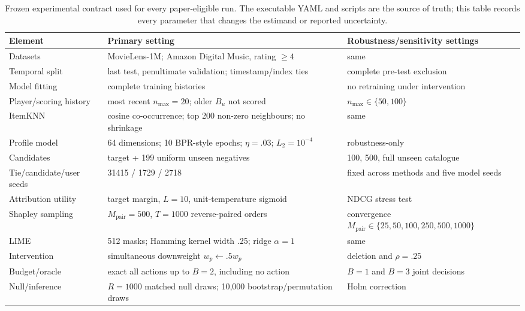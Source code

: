 \documentclass[pdflatex,sn-basic,Numbered]{sn-jnl}
\theoremstyle{thmstyleone}
\theoremstyle{thmstyletwo}
\theoremstyle{thmstylethree}
\begin{document}
\begin{appendices}
\begin{table}[t]
\centering\scriptsize
\caption{Frozen experimental contract used for every paper-eligible run. The executable YAML and scripts are the source of truth; this table records every parameter that changes the estimand or reported uncertainty.}
\label{tab:contract}
\begin{tabular}{@{}p{}p{}p{}@{}}
\toprule
Element & Primary setting & Robustness/sensitivity settings\\
\midrule
Datasets & MovieLens-1M; Amazon Digital Music, rating $\ge4$ & same\\
Temporal split & last test, penultimate validation; timestamp/index ties & complete pre-test exclusion\\
Model fitting & complete training histories & no retraining under intervention\\
Player/scoring history & most recent $n_{\max}=20$; older $B_u$ not scored & $n_{\max}\in\{50,100\}$\\
ItemKNN & cosine co-occurrence; top 200 non-zero neighbours; no shrinkage & same\\
Profile model & 64 dimensions; 10 BPR-style epochs; $\eta=.03$; $L_2=10^{-4}$ & robustness-only\\
Candidates & target + 199 uniform unseen negatives & 100, 500, full unseen catalogue\\
Tie/candidate/user seeds & 31415 / 1729 / 2718 & fixed across methods and five model seeds\\
Attribution utility & target margin, $L=10$, unit-temperature sigmoid & NDCG stress test\\
Shapley sampling & $M_{\mathrm{pair}}=500$, $T=1000$ reverse-paired orders & convergence $M_{\mathrm{pair}}\in\{25,50,100,250,500,1000\}$\\
LIME & 512 masks; Hamming kernel width .25; ridge $\alpha=1$ & same\\
Intervention & simultaneous downweight $w_p\leftarrow.5w_p$ & deletion and $\rho=.25$\\
Budget/oracle & exact all actions up to $B=2$, including no action & $B=1$ and $B=3$ joint decisions\\
Null/inference & $R=1000$ matched null draws; 10,000 bootstrap/permutation draws & Holm correction\\
\bottomrule
\end{tabular}
\end{table}


\end{appendices}
\end{document}
